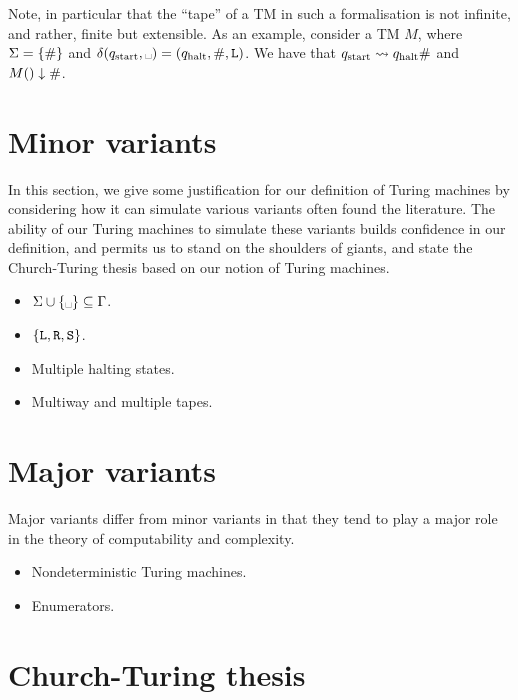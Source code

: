 Note, in particular that the ``tape'' of a TM in such a formalisation is not
infinite, and rather, finite but extensible. As an example, consider a TM $M$,
where $\Sigma=\mathopen{}\left\{{\mathtt{\#}}\right\}\mathclose{}$ and $\delta\p{\qstart, \blank} =
\p{\qhalt,\#,\goleft}$. We have that $q_{\text{start}}\leadsto q_{\text{halt}}\#$ and
$M\mathopen{}\left({}\right)\mathclose{}\downarrow\#$.

\section{Minor variants}

In this section, we give some justification for our definition of Turing
machines by considering how it can simulate various variants often found the
literature. The ability of our Turing machines to simulate these variants
builds confidence in our definition, and permits us to stand on the shoulders
of giants, and state the Church-Turing thesis based on our notion of Turing
machines.

\begin{itemize}

\item $\Sigma\cup\set{\blank}\subseteq\Gamma$.

\item $\mathopen{}\left\{{\mathtt{L},\mathtt{R},\mathtt{S}}\right\}\mathclose{}$.

\item Multiple halting states.

\item Multiway and multiple tapes.

\end{itemize}

\section{Major variants}

Major variants differ from minor variants in that they tend to play a major
role in the theory of computability and complexity.

\begin{itemize}

\item Nondeterministic Turing machines.

\item Enumerators.

\end{itemize}

\section{Church-Turing thesis}

